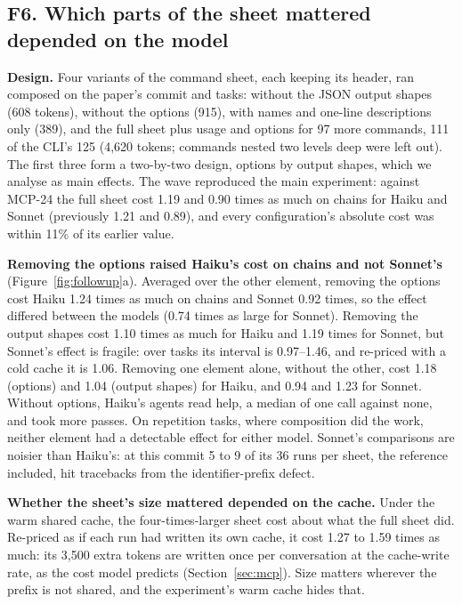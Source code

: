 \documentclass[sigconf,nonacm]{acmart}
\newcommand{\cfg}[1]{\textsf{#1}}
\newcommand{\finding}[1]{\textbf{#1}}
\begin{document}
\subsection{F6. Which parts of the sheet mattered depended on the model}
\label{sec:f6}
\finding{Design.} Four variants of the command sheet, each keeping its header, ran composed on the paper's commit and tasks: without the JSON output shapes (608 tokens), without the options (915), with names and one-line descriptions only (389), and the full sheet plus usage and options for 97 more commands, 111 of the CLI's 125 (4{,}620 tokens; commands nested two levels deep were left out). The first three form a two-by-two design, options by output shapes, which we analyse as main effects. The wave reproduced the main experiment: against \cfg{MCP-24} the full sheet cost 1.19 and 0.90 times as much on chains for Haiku and Sonnet (previously 1.21 and 0.89), and every configuration's absolute cost was within 11\% of its earlier value.

\finding{Removing the options raised Haiku's cost on chains and not Sonnet's} (Figure~\ref{fig:followup}a). Averaged over the other element, removing the options cost Haiku 1.24 times as much on chains and Sonnet 0.92 times, so the effect differed between the models (0.74 times as large for Sonnet). Removing the output shapes cost 1.10 times as much for Haiku and 1.19 times for Sonnet, but Sonnet's effect is fragile: over tasks its interval is 0.97--1.46, and re-priced with a cold cache it is 1.06. Removing one element alone, without the other, cost 1.18 (options) and 1.04 (output shapes) for Haiku, and 0.94 and 1.23 for Sonnet. Without options, Haiku's agents read help, a median of one call against none, and took more passes. On repetition tasks, where composition did the work, neither element had a detectable effect for either model. Sonnet's comparisons are noisier than Haiku's: at this commit 5 to 9 of its 36 runs per sheet, the reference included, hit tracebacks from the identifier-prefix defect.

\finding{Whether the sheet's size mattered depended on the cache.} Under the warm shared cache, the four-times-larger sheet cost about what the full sheet did. Re-priced as if each run had written its own cache, it cost 1.27 to 1.59 times as much: its 3{,}500 extra tokens are written once per conversation at the cache-write rate, as the cost model predicts (Section~\ref{sec:mcp}). Size matters wherever the prefix is not shared, and the experiment's warm cache hides that.
\end{document}

